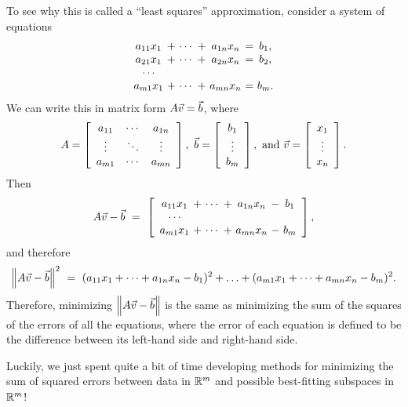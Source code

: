 \documentclass{ximera}
\begin{document}
To see why this is called a ``least squares'' approximation, consider
a system of equations
\begin{equation*}
  \begin{array}{c@{~}c@{~}c@{~}c@{~}c@{~}c@{~}c}
    a_{11}x_1 &+& \cdots &+& a_{1n}x_n &=& b_1, \\
    a_{21}x_1 &+& \cdots &+& a_{2n}x_n &=& b_2, \\
    \cdots  \\
    a_{m1}x_1 &+& \cdots &+& a_{mn}x_n &=& b_m. \\
  \end{array}
\end{equation*}
We can write this in matrix form $A\vect{v}=\vect{b}$, where
\begin{equation*}
  A = \startmat{ccc}
    a_{11} & \cdots & a_{1n} \\
    \vdots & \ddots & \vdots \\
    a_{m1} & \cdots & a_{mn} \\
  \stopmat,
  \quad
  \vect{b} = \startmat{c} b_1 \\ \vdots \\ b_m \stopmat,
  \quad\mbox{and}\quad
  \vect{v} = \startmat{c} x_1 \\ \vdots \\ x_n \stopmat.
\end{equation*}
Then
\begin{equation*}
  A\vect{v} - \vect{b} ~=~
  \startmat{c@{~}c@{~}c@{~}c@{~}c@{~}c@{~}c}
    a_{11}x_1 &+& \cdots &+& a_{1n}x_n &-& b_1 \\
    \cdots \\
    a_{m1}x_1 &+& \cdots &+& a_{mn}x_n &-& b_m \\
  \stopmat,
\end{equation*}
and therefore
\begin{equation*}
  \norm{A\vect{v} - \vect{b}}^2 ~=~
  (a_{11}x_1 + \cdots + a_{1n}x_n - b_1)^2 + \ldots
  + (a_{m1}x_1 + \cdots + a_{mn}x_n - b_m)^2.
\end{equation*}
Therefore, minimizing $\norm{A\vect{v}-\vect{b}}$ is the same as
minimizing the sum of the squares of the errors of all the equations,
where the error of each equation is defined to be the difference
between its left-hand side and right-hand side.

Luckily, we just spent quite a bit of time developing methods for minimizing the sum of squared errors between data in $\RR^m$ and possible best-fitting subspaces in $\RR^m$!
\end{document}
